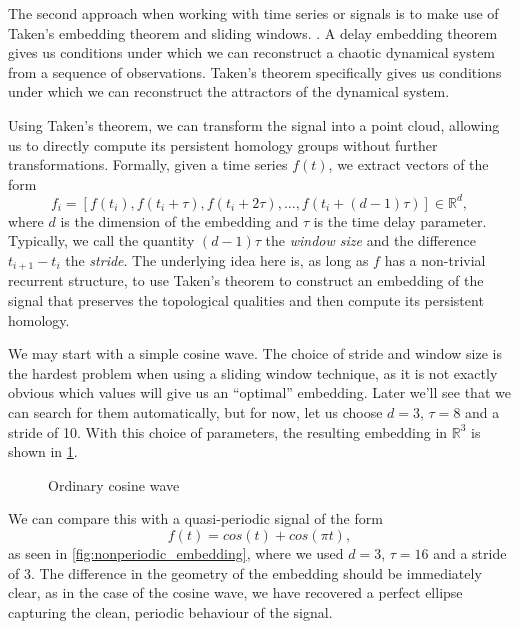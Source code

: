 The second approach when working with time series or signals is to make use of Taken's embedding theorem and sliding windows. \cite{takens2006detecting}. A delay embedding theorem gives us conditions under which we can reconstruct a chaotic dynamical system from a sequence of observations. Taken's theorem specifically gives us conditions under which we can reconstruct the attractors of the dynamical system.

Using Taken's theorem, we can transform the signal into a point cloud, allowing us to directly compute its persistent homology groups without further transformations. Formally, given a time series $f(t)$, we extract vectors of the form
\begin{equation*}
  f_{i} = [f(t_{i}), f(t_{i} + \tau), f(t_{i} + 2\tau), \ldots, f(t_{i} + (d-1)\tau)] \in \mathbb{R}^{d},
\end{equation*}
where $d$ is the dimension of the embedding and $\tau$ is the time delay parameter. Typically, we call the quantity $(d-1)\tau$ the \textit{window size} and the difference $t_{i+1} - t_{i}$ the \textit{stride}. The underlying idea here is, as long as $f$ has a non-trivial recurrent structure, to use Taken's theorem to construct an embedding of the signal that preserves the topological qualities and then compute its persistent homology.

We may start with a simple cosine wave. The choice of stride and window size is the hardest problem when using a sliding window technique, as it is not exactly obvious which values will give us an ``optimal'' embedding. Later we'll see that we can search for them automatically, but for now, let us choose $d=3$, $\tau=8$ and a stride of 10. With this choice of parameters, the resulting embedding in $\mathbb{R}^{3}$ is shown in \ref{fig:cosine_embedding}.

\begin{figure}[h!]
  \centering
  \qquad
  \caption{Ordinary cosine wave}%
  \label{fig:cosine_embedding}%
\end{figure}

We can compare this with a quasi-periodic signal of the form
\begin{equation*}
  f(t) = cos(t) + cos(\pi t),
\end{equation*}
as seen in \ref{fig:nonperiodic_embedding}, where we used $d=3$, $\tau=16$ and a stride of 3. The difference in the geometry of the embedding should be immediately clear, as in the case of the cosine wave, we have recovered a perfect ellipse capturing the clean, periodic behaviour of the signal.

